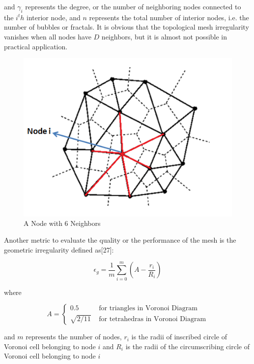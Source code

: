 and $\gamma _i$ represents the degree, or the number of neighboring nodes connected to the $i^th$ interior node, and $n$ represents the total number of interior nodes, i.e. the number of bubbles or fractals. It is obvious that the topological mesh irregularity vanishes when all nodes have $D$ neighbors, but it is almost not possible in practical application. 
	
\begin{figure}[H]
\caption{A Node with 6 Neighbors}
\centering
\includegraphics[scale = 0.70]{voronoi}
\end{figure}

Another metric to evaluate the quality or the performance of the mesh is the geometric irregularity defined as[27]:

\begin{equation}
\epsilon _g = \frac{1}{m} \sum_{i = 0}^{m} (A-\frac{r_i}{R_i})
\end{equation}

where
 
\begin{equation}
A = \left\{ \begin{array}{rl}
0.5                               &\mbox{ for triangles in Voronoi Diagram} \\
\sqrt{2/11}                   &\mbox{ for tetrahedras in Voronoi Diagram}
\end{array} \right.
\end{equation}
		
and $m$ represents the number of nodes, $r_i$ is the radii of inscribed circle of Voronoi cell belonging to node $i$ and $R_i$ is the radii of the circumscribing circle of Voronoi cell belonging to node $i$
	
